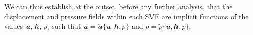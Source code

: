 \documentclass[12pt,a4paper]{article}
\renewcommand{\ta}[1]{\mathbfit{#1}}
\renewcommand{\ts}[1]{\mathbfit{#1}}
\begin{document}
We can thus establish at the outset, before any further analysis, that the displacement and pressure fields within each SVE are implicit functions of the values $\bar{\ta u}$, $\bar{\ts h}$, $\bar{p}$, such that
$\ta u = \tilde{\ta u}\{\bar{\ta u}, \bar{\ts h}, \bar{p}\}$ and $p = \tilde{p}\{\bar{\ta u}, \bar{\ts h}, \bar{p}\}$.
\end{document}
